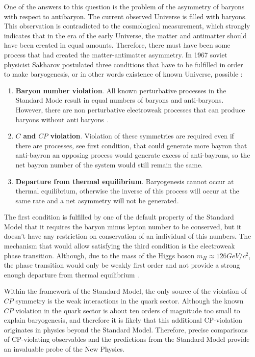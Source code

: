 One of the answers to this question is the problem of the asymmetry of baryons with respect to antibaryon. The current observed Universe is filled with baryons.  This observation is contradicted to the cosmological measurement, which strongly indicates that in the era of the early Universe, the matter and antimatter should have been created in equal amounts. Therefore, there must have been some process that had created the matter-antimatter asymmetry.  
In 1967 soviet physicist Sakharov postulated three conditions that have to be fulfilled in order to make baryogenesis, or in other words existence of known Universe,  possible \cite{sakharov}: 

\begin{enumerate}
    \item \textbf{Baryon number violation}.  All known perturbative processes in the Standard Mode result in equal numbers of baryons and anti-baryons. However, there are non perturbative electroweak processes that can produce baryons without anti baryons \cite{bayron_number_violation}. 
    \item \textbf{$C$ and $CP$ violation}. Violation of these symmetries are required even if there are processes, see first condition, that could generate more bayron that anti-bayron an opposing process would generate excess of anti-bayrons, so the net bayron number of the system would still remain the same.
    \item \textbf{Departure from thermal equilibrium}. Baryogenesis cannot occur at thermal equilibrium, otherwise the inverse of this process  will occur at the same rate and a net asymmetry will not be generated.
\end{enumerate}

The first condition is fulfilled by one of the default property of the Standard Model that it requires the baryon minus lepton number to be conserved, but it doesn't have any restriction on conservation of an individual of this numbers.  The mechanism that would allow satisfying the third condition is the electroweak phase transition. Although, due to the mass of the Higgs boson $m_H \approx 126 GeV/c^{2}$, the phase transition would only be weakly first order and not provide a strong enough departure from thermal equilibrium \cite{phase_transiton}. 

 Within the framework of the Standard Model, the only source of the violation of $CP$ symmetry is the weak interactions in the quark sector. Although the known $CP$ violation in the quark sector is about ten orders of magnitude too small to explain baryogenesis, and therefore it is likely that this additional CP-violation originates in physics beyond the Standard Model. Therefore, precise comparisons of CP-violating observables and the predictions from the Standard Model provide an invaluable probe of the New Physics.